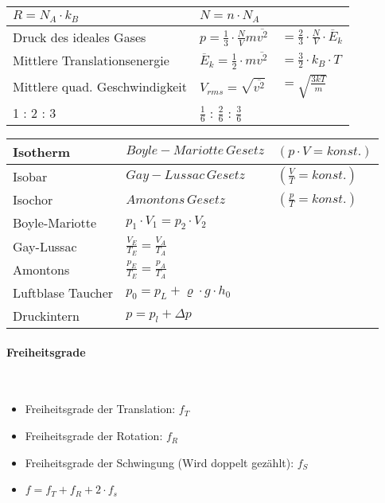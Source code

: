 \begin{tabularx}{\columnwidth}{@{}XXX@{}}
	$R = N_A \cdot k_B $                   & $N = n \cdot N_A$                                                                                           \\ \hline
	Druck des ideales Gases                & $p = \frac{1}{3}\cdot\frac{N}{V}m\overline{v^2}$     & $= \frac{2}{3}\cdot\frac{N}{V}\cdot\overline{E}_k$   \\ \hline
	Mittlere Translationsenergie           & $\overline{E}_k = \frac{1}{2}\cdot m \overline{v^2}$ & $= \frac{3}{2}\cdot k_B \cdot T$                     \\ \hline
	Mittlere quad. Geschwindigkeit         & $V_{rms} = \sqrt{\overline{v^2}}$                    & $= \sqrt{\frac{3kT}{m}}$                             \\ \hline
	1 : 2 : 3                              & $\frac{1}{6}$ : $\frac{2}{6}$ : $\frac{3}{6}$                                                               \\ \hline
\end{tabularx}

\noindent
\begin{tabularx}{\columnwidth}{@{}XXX@{}}
	Isotherm          & $Boyle-Mariotte\,Gesetz$                 & $(p\cdot V = konst.)$    \\ \hline
	Isobar            & $Gay-Lussac\,Gesetz$                     & $(\frac{V}{T} = konst.)$ \\ \hline
	Isochor           & $Amontons\,Gesetz$                       & $(\frac{p}{T} = konst.)$ \\ \hline
	Boyle-Mariotte    & $p_1\cdot V_1 = p_2\cdot V_2$                                       \\ \hline
	Gay-Lussac        & $\frac{V_E}{T_E} = \frac{V_A}{T_A}$                                 \\ \hline
	Amontons          & $\frac{p_E}{T_E} = \frac{p_A}{T_A}$                                 \\ \hline
	Luftblase Taucher & $p_0 = p_L + \varrho \cdot  g \cdot h_0$                            \\ \hline
	Druckintern       & $p = p_l + \Delta p$                                                \\ \hline
\end{tabularx}
\vspace{1mm}

\paragraph{Freiheitsgrade}\mbox{}\\
\noindent
\begin{itemize}
	\item Freiheitsgrade der Translation: $f_T$
	\item Freiheitsgrade der Rotation: $f_R$
	\item Freiheitsgrade der Schwingung (Wird doppelt gezählt): $f_S$
	\item $f = f_T + f_R + 2\cdot f_s$
\end{itemize}

